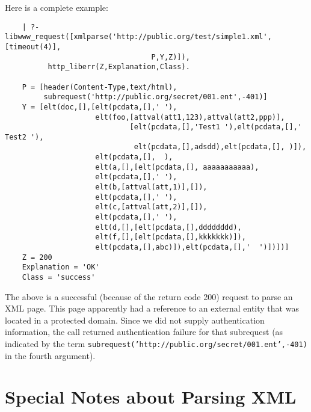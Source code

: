 Here is a complete example:
\begin{verbatim}
    | ?- libwww_request([xmlparse('http://public.org/test/simple1.xml',[timeout(4)],
                                  P,Y,Z)]),
          http_liberr(Z,Explanation,Class).

    P = [header(Content-Type,text/html),
         subrequest('http://public.org/secret/001.ent',-401)]
    Y = [elt(doc,[],[elt(pcdata,[],' '),
                     elt(foo,[attval(att1,123),attval(att2,ppp)],
                             [elt(pcdata,[],'Test1 '),elt(pcdata,[],' Test2 '),
                              elt(pcdata,[],adsdd),elt(pcdata,[], )]),
                     elt(pcdata,[],  ),
                     elt(a,[],[elt(pcdata,[], aaaaaaaaaaa),
                     elt(pcdata,[],' '),
                     elt(b,[attval(att,1)],[]),
                     elt(pcdata,[],' '),
                     elt(c,[attval(att,2)],[]),
                     elt(pcdata,[],' '),
                     elt(d,[],[elt(pcdata,[],dddddddd),
                     elt(f,[],[elt(pcdata,[],kkkkkkk)]),
                     elt(pcdata,[],abc)]),elt(pcdata,[],'  ')])])]
    Z = 200
    Explanation = 'OK'
    Class = 'success'
\end{verbatim}
The above is a successful (because of the return code 200) request to parse
an XML page. This page apparently had a reference to an external entity
that was located in a protected domain. Since we did not supply
authentication information, the call returned authentication failure for
that subrequest (as indicated by the term 
{\tt subrequest('http://public.org/secret/001.ent',-401)} in the fourth
argument).

\section{Special Notes about Parsing XML}

